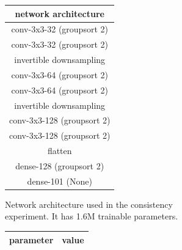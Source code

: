    \begin{figure}
    \begin{subfigure}[b]{0.49\textwidth}
            \small
            \centering
            \begin{tabular}{c}
                \hline
                network architecture \\
                \hline
                conv-3x3-32 (groupsort 2)\\
                conv-3x3-32 (groupsort 2) \\
                invertible downsampling \\
                conv-3x3-64 (groupsort 2) \\
                conv-3x3-64 (groupsort 2) \\ 
                invertible downsampling \\
                conv-3x3-128 (groupsort 2) \\
                conv-3x3-128 (groupsort 2) \\ 
                flatten \\
                dense-128 (groupsort 2) \\
                dense-101 (None) \\
                \hline
            \end{tabular}
            \caption{Network architecture used in the consistency experiment. It has 1.6M trainable parameters.}
            \label{fig:consistency-archi}
        \end{subfigure}
        \hfill
        \begin{subfigure}[b]{0.49\textwidth}
            \small
            \centering
            \begin{tabular}{cc}%
                \hline
                parameter & value \\
                \hline

\end{tabular}
\end{subfigure}
\end{figure}
